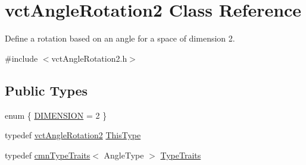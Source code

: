 \hypertarget{classvct_angle_rotation2}{\section{vct\-Angle\-Rotation2 Class Reference}
\label{classvct_angle_rotation2}
}


Define a rotation based on an angle for a space of dimension 2.  




{\ttfamily \#include $<$vct\-Angle\-Rotation2.\-h$>$}

\subsection*{Public Types}
\begin{DoxyCompactItemize}
\item 
enum \{ \hyperlink{classvct_angle_rotation2_afbea62c89658b43900b288ac6f3981e6a511d05c6ad1614fcd0459444b62b4364}{D\-I\-M\-E\-N\-S\-I\-O\-N} = 2
 \}
\item 
typedef \hyperlink{classvct_angle_rotation2}{vct\-Angle\-Rotation2} \hyperlink{classvct_angle_rotation2_a67339254f084f89c13aca70c1242d18e}{This\-Type}
\item 
typedef \hyperlink{classcmn_type_traits}{cmn\-Type\-Traits}$<$ Angle\-Type $>$ \hyperlink{classvct_angle_rotation2_a218a0396bd24a4b2ece9e886a84a567c}{Type\-Traits}
\end{DoxyCompactItemize}
